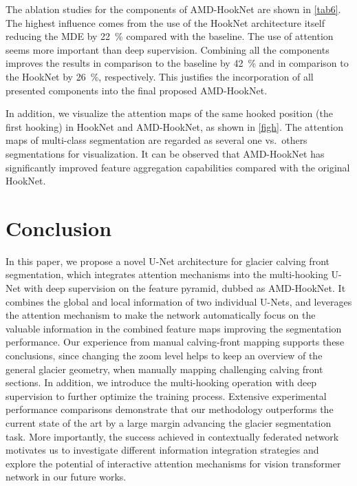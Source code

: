 \documentclass[lettersize,journal,siunitx]{IEEEtran}
\begin{document}
The ablation studies for the components of AMD-HookNet are shown in \cref{tab6}. The highest influence comes from the use of the HookNet architecture itself reducing the MDE by \SI{22}{\percent} compared with the baseline. The use of attention seems more important than deep supervision. Combining all the components improves the results in comparison to the baseline by \SI{42}{\percent} and in comparison to the HookNet by \SI{26}{\percent}, respectively. This justifies the incorporation of all presented components into the final proposed AMD-HookNet.

In addition, we visualize the attention maps of the same hooked position (the first hooking) in HookNet and AMD-HookNet, as shown in \cref{figh}. The attention maps of multi-class segmentation are regarded as several one vs.\ others segmentations for visualization. It can be observed that AMD-HookNet has significantly improved feature aggregation capabilities compared with the original HookNet.

\section{Conclusion}\label{sec:conclusion}
In this paper, we propose a novel U-Net architecture for glacier calving front segmentation, which integrates attention mechanisms into the multi-hooking U-Net with deep supervision on the feature pyramid, dubbed as AMD-HookNet. It combines the global and local information of two individual U-Nets, and leverages the attention mechanism to make the network automatically focus on the valuable information in the combined feature maps improving the segmentation performance. Our experience from manual calving-front mapping supports these conclusions, since changing the zoom level helps to keep an overview of the general glacier geometry, when manually mapping challenging calving front sections. In addition, we introduce the multi-hooking operation with deep supervision to further optimize the training process. Extensive experimental performance comparisons demonstrate that our methodology outperforms the current state of the art by a large margin advancing the glacier segmentation task. More importantly, the success achieved in contextually federated network motivates us to investigate different information integration strategies and explore the potential of interactive attention mechanisms for vision transformer network in our future works.
\end{document}
